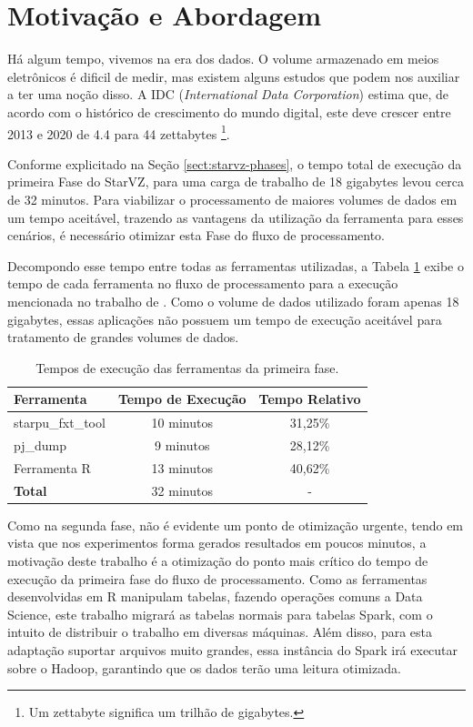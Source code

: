 \section{Motivação e Abordagem}\label{sect:motivation}

Há algum tempo, vivemos na era dos dados. O volume armazenado em 
meios eletrônicos é dificil de medir, mas existem alguns estudos que podem nos 
auxiliar a ter uma noção disso. A IDC (\textit{International 
Data Corporation}) \cite{ref:idcdigitaluniverse} estima que, de acordo com o histórico de crescimento do mundo digital, este deve crescer entre 2013 e 2020 de 4.4 para 44 zettabytes \footnote{Um zettabyte significa um trilhão de gigabytes.}.

Conforme explicitado na Seção \ref{sect:starvz-phases}, o tempo total de execução da primeira Fase do StarVZ, para uma carga de trabalho de 18 gigabytes levou cerca de 32 minutos. Para viabilizar o processamento de maiores volumes de dados em um tempo aceitável, trazendo as vantagens da utilização da ferramenta para esses cenários, 
é necessário otimizar esta Fase do fluxo de processamento.  

Decompondo esse tempo entre todas as ferramentas utilizadas, a Tabela 
\ref{tab:exectimes} exibe o tempo de cada ferramenta no fluxo de processamento 
para a execução mencionada no trabalho de \citet{ref:starvz}. Como o volume de 
dados utilizado foram apenas 18 gigabytes, essas aplicações não possuem um tempo 
de execução aceitável para tratamento
de grandes volumes de dados.

\begin{table}[H]
\centering
\begin{tabular}{l c c} \toprule
\textbf{Ferramenta}  &  \textbf{Tempo de Execução}  & \textbf{Tempo Relativo}\\ \midrule
starpu\_fxt\_tool     & 10 minutos   & 31,25\%  \\
pj\_dump            & 9 minutos    & 28,12\%     \\
Ferramenta R        & 13 minutos   & 40,62\%      \\
\textbf{Total}     & 32 minutos & -
\end{tabular}
\caption{Tempos de execução das ferramentas da primeira fase.}
\label{tab:exectimes}
\end{table}

Como na segunda fase, não é evidente um ponto de otimização urgente, tendo em 
vista que nos experimentos forma gerados resultados em poucos minutos, a 
motivação deste trabalho é a otimização do ponto mais crítico do tempo de 
execução da primeira fase do fluxo de processamento. Como as ferramentas 
desenvolvidas em R manipulam tabelas, fazendo 
operações comuns a Data Science, este trabalho migrará as tabelas normais para 
tabelas Spark, com o intuito de distribuir o trabalho em diversas máquinas. 
Além disso, 
para esta adaptação suportar arquivos muito grandes, essa instância do Spark irá
executar sobre o Hadoop, garantindo que os dados terão uma leitura otimizada.